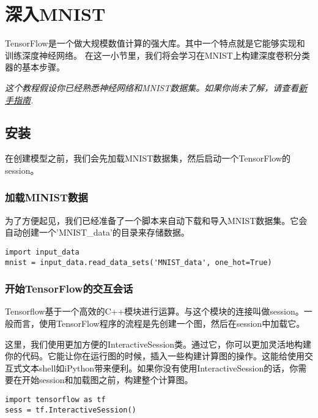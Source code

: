



\newpage
\section {深入MNIST} \label{MINIST_pros}
TensorFlow是一个做大规模数值计算的强大库。其中一个特点就是它能够实现和训练深度神经网络。 在这一小节里，我们将会学习在MNIST上构建深度卷积分类器的基本步骤。

\emph{这个教程假设你已经熟悉神经网络和MNIST数据集。如果你尚未了解，请查看\hyperref[MINIST_beginner]{新手指南}.}

\subsection {安装}
在创建模型之前，我们会先加载MNIST数据集，然后启动一个TensorFlow的session。

\subsubsection {加载MINIST数据}

为了方便起见，我们已经准备了一个脚本来自动下载和导入MNIST数据集。它会自动创建一个'MNIST\_data'的目录来存储数据。

\begin{lstlisting}
import input_data
mnist = input_data.read_data_sets('MNIST_data', one_hot=True)
\end{lstlisting}

\subsubsection {开始TensorFlow的交互会话}

Tensorflow基于一个高效的C++模块进行运算。与这个模块的连接叫做session。一般而言，使用TensorFlow程序的流程是先创建一个图，然后在session中加载它。

这里，我们使用更加方便的InteractiveSession类。通过它，你可以更加灵活地构建你的代码。它能让你在运行图的时候，插入一些构建计算图的操作。这能给使用交互式文本shell如iPython带来便利。如果你没有使用InteractiveSession的话，你需要在开始session和加载图之前，构建整个计算图。

\begin{lstlisting}
import tensorflow as tf
sess = tf.InteractiveSession()
\end{lstlisting}

